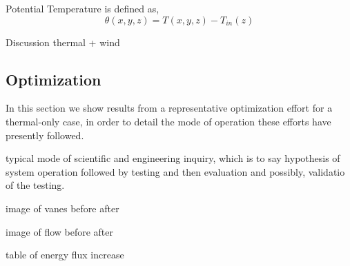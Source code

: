 Potential Temperature is defined as,
\begin{equation}
  \theta(x,y,z) = T(x,y,z) -T_{in}(z) 
\end{equation}

Discussion thermal + wind

\subsection{Optimization}

In this section we show results from a representative optimization
effort for a thermal-only case, in order to detail the mode of operation
these efforts have presently followed. 

typical mode of scientific and engineering inquiry, which is to say
hypothesis of system operation followed by testing and then evaluation
and possibly, validatio of the testing. 

image of vanes before after

image of flow before after

table of energy flux increase